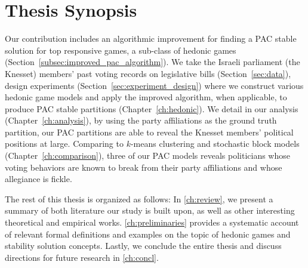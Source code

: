 \section{Thesis Synopsis}
Our contribution includes an algorithmic improvement for finding a PAC stable
solution for top responsive games, a sub-class of hedonic games
(Section~\ref{subsec:improved_pac_algorithm}).
We take the Israeli parliament (the Knesset) members' past voting records on
legislative bills (Section~\ref{sec:data}), design experiments
(Section~\ref{sec:experiment_design}) where we construct various hedonic game
models and apply the improved algorithm, when applicable, to produce PAC stable
partitions (Chapter~\ref{ch:hedonic}).
We detail in our analysis (Chapter~\ref{ch:analysis}), by using the party
affiliations as the ground truth partition, our PAC partitions are able to
reveal the Knesset members' political positions at large.
Comparing to $k$-means clustering and stochastic block models
(Chapter~\ref{ch:comparison}), three of our PAC models reveals politicians
whose voting behaviors are known to break from their party affiliations and
whose allegiance is fickle.

The rest of this thesis is organized as follows:
In \autoref{ch:review}, we present a summary of both literature our study is
built upon, as well as other interesting theoretical and empirical works.
\autoref{ch:preliminaries} provides a systematic account of relevant formal
definitions and examples on the topic of hedonic games and stability solution
concepts.
Lastly, we conclude the entire thesis and discuss directions for future
research in \autoref{ch:concl}.

